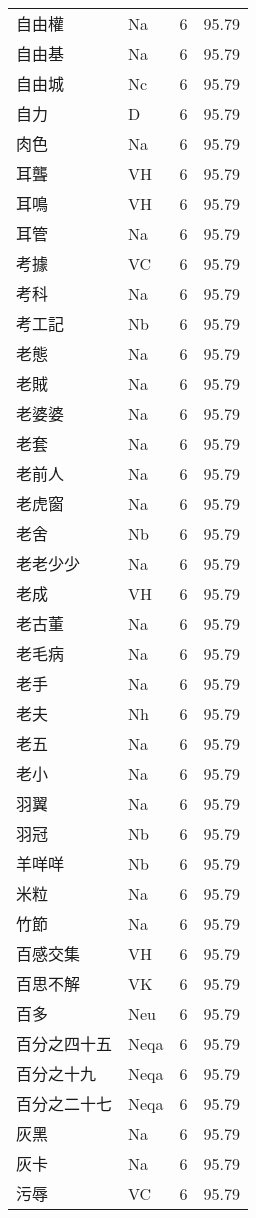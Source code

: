 \documentclass[twocolumn]{book}
\begin{document}
\begin{supertabular}{llrr}
自由權 & Na & 6 &  95.79\\
自由基 & Na & 6 &  95.79\\
自由城 & Nc & 6 &  95.79\\
自力 & D & 6 &  95.79\\
肉色 & Na & 6 &  95.79\\
耳聾 & VH & 6 &  95.79\\
耳鳴 & VH & 6 &  95.79\\
耳管 & Na & 6 &  95.79\\
考據 & VC & 6 &  95.79\\
考科 & Na & 6 &  95.79\\
考工記 & Nb & 6 &  95.79\\
老態 & Na & 6 &  95.79\\
老賊 & Na & 6 &  95.79\\
老婆婆 & Na & 6 &  95.79\\
老套 & Na & 6 &  95.79\\
老前人 & Na & 6 &  95.79\\
老虎窗 & Na & 6 &  95.79\\
老舍 & Nb & 6 &  95.79\\
老老少少 & Na & 6 &  95.79\\
老成 & VH & 6 &  95.79\\
老古董 & Na & 6 &  95.79\\
老毛病 & Na & 6 &  95.79\\
老手 & Na & 6 &  95.79\\
老夫 & Nh & 6 &  95.79\\
老五 & Na & 6 &  95.79\\
老小 & Na & 6 &  95.79\\
羽翼 & Na & 6 &  95.79\\
羽冠 & Nb & 6 &  95.79\\
羊咩咩 & Nb & 6 &  95.79\\
米粒 & Na & 6 &  95.79\\
竹節 & Na & 6 &  95.79\\
百感交集 & VH & 6 &  95.79\\
百思不解 & VK & 6 &  95.79\\
百多 & Neu & 6 &  95.79\\
百分之四十五 & Neqa & 6 &  95.79\\
百分之十九 & Neqa & 6 &  95.79\\
百分之二十七 & Neqa & 6 &  95.79\\
灰黑 & Na & 6 &  95.79\\
灰卡 & Na & 6 &  95.79\\
污辱 & VC & 6 &  95.79\\

\end{supertabular}
\end{document}
